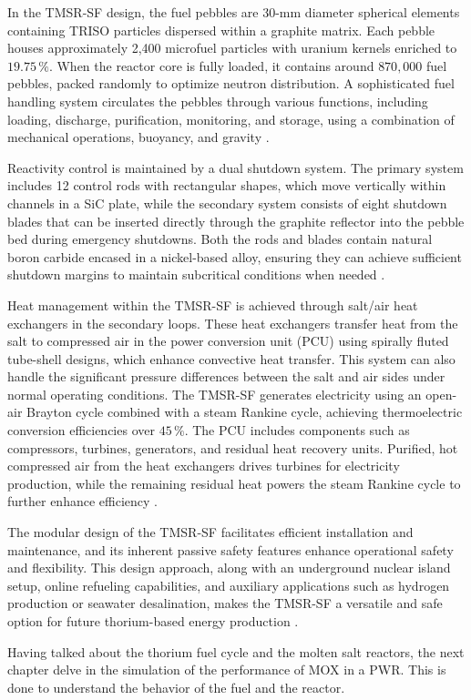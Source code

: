 In the TMSR-SF design, the fuel pebbles are 30-mm diameter spherical elements containing TRISO particles dispersed within a graphite matrix. Each pebble houses approximately 2,400 microfuel particles with uranium kernels enriched to \(19.75 \, \%\). When the reactor core is fully loaded, it contains around \(870,000\) fuel pebbles, packed randomly to optimize neutron distribution. A sophisticated fuel handling system circulates the pebbles through various functions, including loading, discharge, purification, monitoring, and storage, using a combination of mechanical operations, buoyancy, and gravity \cite{TMSR_book}.

Reactivity control is maintained by a dual shutdown system. The primary system includes 12 control rods with rectangular shapes, which move vertically within channels in a SiC plate, while the secondary system consists of eight shutdown blades that can be inserted directly through the graphite reflector into the pebble bed during emergency shutdowns. Both the rods and blades contain natural boron carbide encased in a nickel-based alloy, ensuring they can achieve sufficient shutdown margins to maintain subcritical conditions when needed \cite{TMSR_book}.

Heat management within the TMSR-SF is achieved through salt/air heat exchangers in the secondary loops. These heat exchangers transfer heat from the salt to compressed air in the power conversion unit (PCU) using spirally fluted tube-shell designs, which enhance convective heat transfer. This system can also handle the significant pressure differences between the salt and air sides under normal operating conditions. The TMSR-SF generates electricity using an open-air Brayton cycle combined with a steam Rankine cycle, achieving thermoelectric conversion efficiencies over \(45 \, \%\). The PCU includes components such as compressors, turbines, generators, and residual heat recovery units. Purified, hot compressed air from the heat exchangers drives turbines for electricity production, while the remaining residual heat powers the steam Rankine cycle to further enhance efficiency \cite{TMSR_book}.

The modular design of the TMSR-SF facilitates efficient installation and maintenance, and its inherent passive safety features enhance operational safety and flexibility. This design approach, along with an underground nuclear island setup, online refueling capabilities, and auxiliary applications such as hydrogen production or seawater desalination, makes the TMSR-SF a versatile and safe option for future thorium-based energy production \cite{TMSR_book}.

Having talked about the thorium fuel cycle and the molten salt reactors, the next chapter delve in the simulation of the performance of MOX in a PWR. This is done to understand the behavior of the fuel and the reactor.